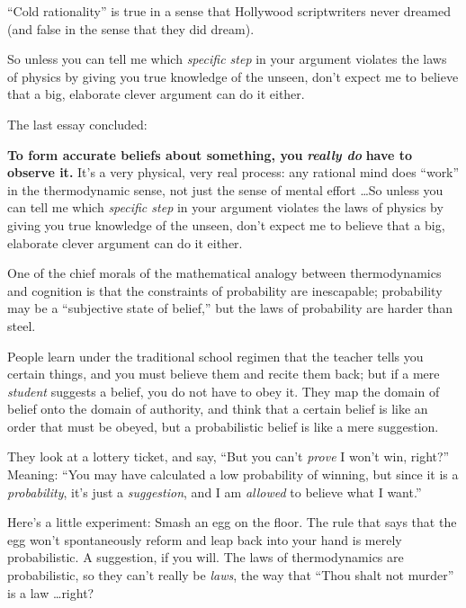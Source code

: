 {
 ``Cold rationality'' is true in
a sense that Hollywood scriptwriters never dreamed (and false in the
sense that they did dream).}

{
 So unless you can tell me which \textit{specific step} in your
argument violates the laws of physics by giving you true knowledge of
the unseen, don't expect me to believe that a big,
elaborate clever argument can do it either.}

\myendsectiontext


{
 The last essay concluded:}

{
 \textbf{To form accurate beliefs about something, you
}\textbf{\textit{really do}}\textbf{ have to observe it.}
It's a very physical, very real process: any rational
mind does ``work'' in the
thermodynamic sense, not just the sense of mental effort \ldots So
unless you can tell me which \textit{specific step} in your argument
violates the laws of physics by giving you true knowledge of the
unseen, don't expect me to believe that a big,
elaborate clever argument can do it either.}

{
 One of the chief morals of the mathematical analogy between
thermodynamics and cognition is that the constraints of probability are
inescapable; probability may be a ``subjective state
of belief,'' but the laws of probability are harder
than steel.}

{
 People learn under the traditional school regimen that the teacher
tells you certain things, and you must believe them and recite them
back; but if a mere \textit{student} suggests a belief, you do not have
to obey it. They map the domain of belief onto the domain of authority,
and think that a certain belief is like an order that must be obeyed,
but a probabilistic belief is like a mere suggestion.}

{
 They look at a lottery ticket, and say, ``But you
can't \textit{prove} I won't win,
right?'' Meaning: ``You may have
calculated a low probability of winning, but since it is a
\textit{probability}, it's just a \textit{suggestion},
and I am \textit{allowed} to believe what I want.''}

{
 Here's a little experiment: Smash an egg on the
floor. The rule that says that the egg won't
spontaneously reform and leap back into your hand is merely
probabilistic. A suggestion, if you will. The laws of thermodynamics
are probabilistic, so they can't really be
\textit{laws}, the way that ``Thou shalt not
murder'' is a law \ldots right?}

